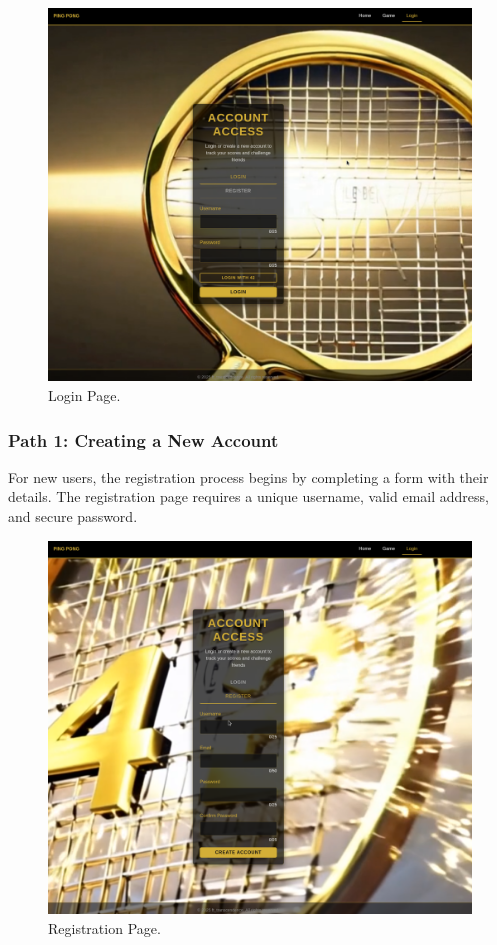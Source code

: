 \begin{figure}[H]
    \centering
    \includegraphics[width=0.7\linewidth]{Figures/images/new_images/LoginPage.png}
    \caption{Login Page.} %
    \label{fig:login-page}
\end{figure}

\subsubsection{Path 1: Creating a New Account} For new users, the registration process begins by completing a form with their details. The registration page requires a unique username, valid email address, and secure password.

\begin{figure}[H]
    \centering
    \includegraphics[width=0.7\linewidth]{Figures/images/new_images/RegistrationPage.png}
    \caption{Registration Page.} %
    \label{fig:registration-page}
\end{figure}

